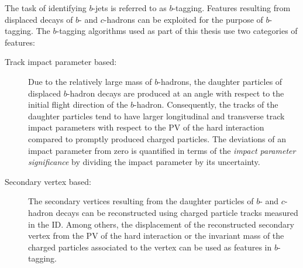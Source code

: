 The task of identifying $b$-jets is referred to as $b$-tagging. Features
resulting from displaced decays of $b$- and $c$-hadrons can be exploited for the
purpose of $b$-tagging. The $b$-tagging algorithms used as part of this thesis
use two categories of features:
\begin{description}

\item[Track impact parameter based:] Due to the relatively large mass of
  $b$-hadrons, the daughter particles of displaced $b$-hadron decays are
  produced at an angle with respect to the initial flight direction of the
  $b$-hadron. Consequently, the tracks of the daughter particles tend to have
  larger longitudinal and transverse track impact parameters with respect to the
  PV of the hard interaction compared to promptly produced charged
  particles. The deviations of an impact parameter from zero is quantified in
  terms of the \emph{impact parameter significance} by dividing the impact
  parameter by its uncertainty.

\item[Secondary vertex based:] The secondary vertices resulting from the
  daughter particles of $b$- and $c$-hadron decays can be reconstructed using
  charged particle tracks measured in the ID. Among others, the displacement of
  the reconstructed secondary vertex from the PV of the hard interaction or the
  invariant mass of the charged particles associated to the vertex can be used
  as features in $b$-tagging.

\end{description}


